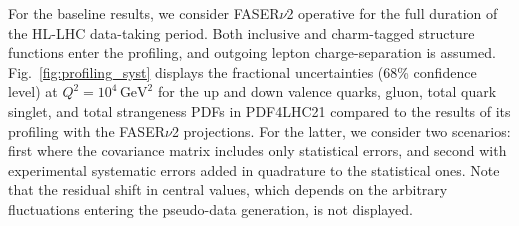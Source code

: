 For the baseline results, we consider FASER$\nu$2 operative for the full duration
of the HL-LHC data-taking period.
%
Both inclusive and charm-tagged structure functions enter the profiling,
and outgoing lepton charge-separation is assumed.
%
Fig.~\ref{fig:profiling_syst} displays the
fractional uncertainties   (68\% confidence level) at $Q^2 = 10^4 \, \textrm{GeV}^2$ 
for the up and down valence quarks, gluon, total quark singlet, and total strangeness PDFs
in PDF4LHC21 compared to the results of its profiling with the FASER$\nu$2 projections.
%
For the latter, we consider two scenarios: first where the covariance matrix includes
only statistical errors, and second with experimental systematic
errors added in quadrature to the statistical ones.
%
Note that the residual shift in central values, which depends on the arbitrary fluctuations
entering the pseudo-data generation, is not displayed.

